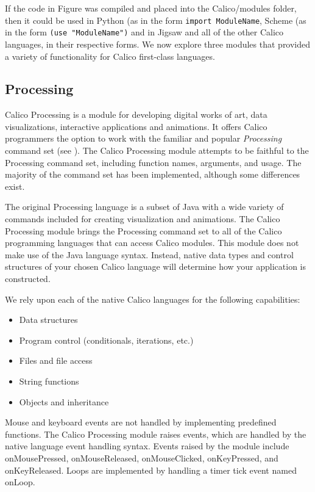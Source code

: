 \documentclass[preprint]{sigplanconf}
\begin{document}
If the code in Figure was compiled and placed into the Calico/modules
folder, then it could be used in Python (as in the form \texttt{import
ModuleName}, Scheme (as in the form \texttt{(use "ModuleName")} and in
Jigsaw and all of the other Calico languages, in their respective
forms. We now explore three modules that provided a variety of
functionality for Calico first-class languages.

\subsection{Processing}

Calico Processing is a module for developing digital works of art,
data visualizations, interactive applications and animations. It
offers Calico programmers the option to work with the familiar and
popular \textit{Processing} command set (see \cite{processing}). The Calico
Processing module attempts to be faithful to the Processing command
set, including function names, arguments, and usage. The majority of
the command set has been implemented, although some differences exist.

The original Processing language is a subset of Java with a wide variety of
commands included for creating visualization and animations. The
Calico Processing module brings the Processing command set to all of the Calico
programming languages that can access Calico modules. This module does not make use of the Java
language syntax. Instead, native data types and control structures of
your chosen Calico language will determine how your application is
constructed.

We rely upon each of the native Calico languages for the following capabilities:

\begin{itemize}
\item Data structures
\item Program control (conditionals, iterations, etc.)
\item Files and file access
\item String functions
\item Objects and inheritance
\end{itemize}

Mouse and keyboard events are not handled by implementing predefined
functions. The Calico Processing module raises events, which are
handled by the native language event handling syntax. Events raised by
the module include onMousePressed, onMouseReleased, onMouseClicked,
onKeyPressed, and onKeyReleased. Loops are implemented by handling a
timer tick event named onLoop.
\end{document}
